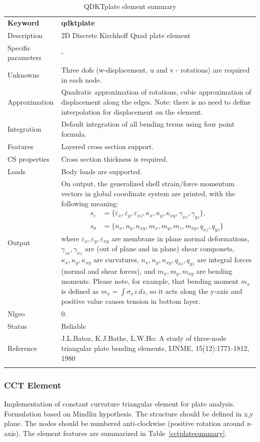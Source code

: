 \documentclass[a4paper]{article}
\newcommand{\param}[1]{\texttt{#1}} %
\newcommand{\templabel}{}%
\newcommand{\tempcaption}{}%
\newcounter{nelpar}
\newenvironment{elementsummary}[5]{%
  \gdef\tempcaption{#4}%
  \gdef\templabel{#5}%
  \setcounter{nelpar}{0}%
  \begin{center} %
    \begin{table}[!htb] %
      \begin{tabular}{|l|p{9cm}|}\hline %
        {\bf Keyword} & \bf{#1}\\ %
        {Description} & {#2}\\ %
        {Specific parameters} & {#3}\\ \hline %
}{
  \\ \hline %
      \end{tabular}%
      \caption{\tempcaption}%
      \label{\templabel}%
    \end{table}%
  \end{center}%
}
\newcommand{\elementParam}[1]{%
  \ifthenelse{\value{nelpar}>0} %
             {&{#1}}%
             {\setcounter{nelpar}{1}Parameters&{#1}}%
             \\%
}
\newcommand{\elementDescription}[2]{{#1} & {#2}\\}
\begin{document}
\begin{elementsummary}{qdktplate}{2D Discrete Kirchhoff Quad plate element}{-}{QDKTplate element summary}{qdktplatesummary}
\elementDescription{Unknowns}{Three dofs (w-displacement, u and v - rotations) are required in each node.}
\elementDescription{Approximation}{Quadratic approximation of rotations, cubic approximation of displacement along the edges. Note: there is no need to define interpolation for displacement on the element.}
\elementDescription{Integration}{Default integration of all bending terms using four point formula.}
\elementDescription{Features}{Layered cross section support.}
\elementDescription{CS properties}{Cross section thickness is required.}
\elementDescription{Loads}{Body loads are supported.}
\elementDescription{Output}{On output, the generalized shell strain/force momentum vectors in global coordinate system are printed, with the following meaning:
\begin{align*}
s_{\varepsilon} &= \{\varepsilon_x, \varepsilon_y, \varepsilon_{xz}, \kappa_x, \kappa_y, \kappa_{xy}, \gamma_{xz}, \gamma_{yz}\},\\
s_{\sigma} &= \{n_x, n_y, n_{xy}, m_x, m_y, m_z, m_{xy}, q_{xz}, q_{yz}\}
\end{align*}
where $\varepsilon_x, \varepsilon_y, \varepsilon_{xy}$ are membrane in plane normal deformations, $\gamma_{zx}, \gamma_{xz}$ are (out of plane and in plane) shear componets, $\kappa_x, \kappa_y, \kappa_{xy}$ are curvatures, $n_x, n_y, n_{xy}, q_{xz}, q_{yz}$ are integral forces (normal and shear forces), and $m_x, m_y, m_{xy}$ are bending moments. 
Please note, for example, that bending moment $m_x$ is defined as $m_x=\int \sigma_x z\ dz$, so it acts along the y-axis and positive value causes tension in bottom layer.}
\elementDescription{Nlgeo}{0.}
\elementDescription{Status}{Reliable}
\elementDescription{Reference}{J.L.Batoz, K.J.Bathe, L.W.Ho: A study of three-node triangular plate bending elements, IJNME, 15(12):1771-1812, 1980}
\end{elementsummary}

\subsubsection {CCT Element}
\label{cct}
Implementation of constant curvature triangular element for plate
analysis. Formulation based on Mindlin hypothesis. The structure should be defined in x,y plane. 
The nodes should be numbered anti-clockwise (positive rotation around
z-axis). The element features are summarized in Table~\ref{cctplatesummary}.
\end{document}
